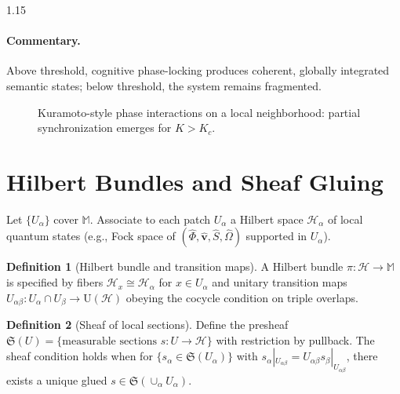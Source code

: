 \documentclass[12pt,a4paper]{article}
\numberwithin{equation}{section}
\theoremstyle{definition}
\newtheorem{definition}{Definition}[section]
\theoremstyle{plain}
\theoremstyle{remark}
\newcommand{\M}{\mathbb{M}}
\newcommand{\R}{\mathbb{R}}
\newcommand{\hPhi}{\hat{\Phi}}
\newcommand{\hv}{\hat{\mathbf{v}}}
\newcommand{\hS}{\hat{S}}
\newcommand{\hO}{\hat{\Omega}}
\begin{document}
\begin{spacing}{1.15}
\paragraph{Commentary.}
Above threshold, cognitive phase-locking produces coherent, globally integrated semantic states; below threshold, the system remains fragmented.

\begin{figure}[H]
\centering
{}
\caption{Kuramoto-style phase interactions on a local neighborhood: partial synchronization emerges for $K>K_c$.}
\label{fig:phaseflow}
\end{figure}

\section{Hilbert Bundles and Sheaf Gluing}\label{sec:hilbert-sheaf}
Let $\{U_\alpha\}$ cover $\M$. Associate to each patch $U_\alpha$ a Hilbert space $\mathcal{H}_\alpha$ of local quantum states (e.g., Fock space of $(\hPhi,\hv,\hS,\hO)$ supported in $U_\alpha$).

\begin{definition}[Hilbert bundle and transition maps]
A Hilbert bundle $\pi:\mathscr{H}\to \M$ is specified by fibers $\mathscr{H}_x\cong \mathcal{H}_\alpha$ for $x\in U_\alpha$ and unitary transition maps $U_{\alpha\beta}: U_\alpha\cap U_\beta\to \mathrm{U}(\mathcal{H})$ obeying the cocycle condition on triple overlaps.
\end{definition}

\begin{definition}[Sheaf of local sections]
Define the presheaf $\mathfrak{S}(U)=\{\text{measurable sections } s:U\to \mathscr{H}\}$ with restriction by pullback. The sheaf condition holds when for $\{s_\alpha\in \mathfrak{S}(U_\alpha)\}$ with $s_\alpha|_{U_{\alpha\beta}}=U_{\alpha\beta}s_\beta|_{U_{\alpha\beta}}$, there exists a unique glued $s\in \mathfrak{S}(\cup_\alpha U_\alpha)$.
\end{definition}


\end{spacing}
\end{document}
